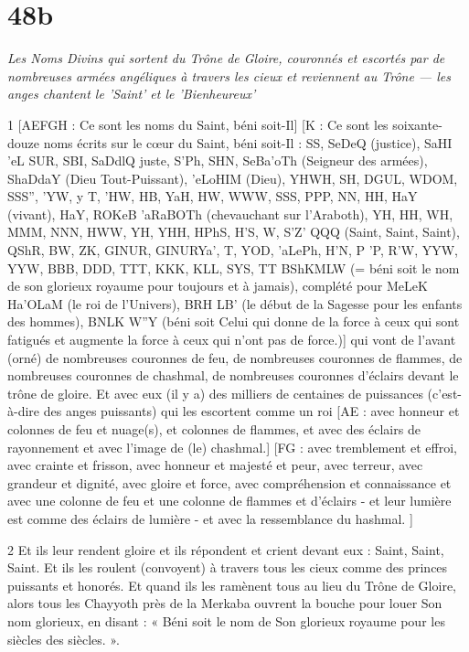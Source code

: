 \chapter{48b}

\par \textit{Les Noms Divins qui sortent du Trône de Gloire, couronnés et escortés par de nombreuses armées angéliques à travers les cieux et reviennent au Trône — les anges chantent le 'Saint' et le 'Bienheureux'}

\par 1 [AEFGH : Ce sont les noms du Saint, béni soit-Il] [K : Ce sont les soixante-douze noms écrits sur le cœur du Saint, béni soit-Il : SS, SeDeQ (justice), SaHI 'eL SUR, SBI, SaDdlQ {juste}, S'Ph, SHN, SeBa'oTh (Seigneur des armées), ShaDdaY (Dieu Tout-Puissant), 'eLoHIM (Dieu), YHWH, SH, DGUL, WDOM, SSS'', 'YW, y T, 'HW, HB, YaH, HW, WWW, SSS, PPP, NN, HH, HaY (vivant), HaY, ROKeB 'aRaBOTh (chevauchant sur l'Araboth), YH, HH, WH, MMM, NNN, HWW, YH, YHH, HPhS, H'S, W, S'Z' QQQ (Saint, Saint, Saint), QShR, BW, ZK, GINUR, GINURYa', T, YOD, 'aLePh, H'N, P 'P, R'W, YYW, YYW, BBB, DDD, TTT, KKK, KLL, SYS, TT BShKMLW (= béni soit le nom de son glorieux royaume pour toujours et à jamais), complété pour MeLeK Ha'OLaM (le roi de l'Univers), BRH LB' (le début de la Sagesse pour les enfants des hommes), BNLK W''Y (béni soit Celui qui donne de la force à ceux qui sont fatigués et augmente la force à ceux qui n'ont pas de force.)] qui vont de l'avant (orné) de nombreuses couronnes de feu, de nombreuses couronnes de flammes, de nombreuses couronnes de chashmal, de nombreuses couronnes d'éclairs devant le trône de gloire. Et avec eux (il y a) des milliers de centaines de puissances (c'est-à-dire des anges puissants) qui les escortent comme un roi [AE : avec honneur et colonnes de feu et nuage(s), et colonnes de flammes, et avec des éclairs de rayonnement et avec l'image de (le) chashmal.] [FG : avec tremblement et effroi, avec crainte et frisson, avec honneur et majesté et peur, avec terreur, avec grandeur et dignité, avec gloire et force, avec compréhension et connaissance et avec une colonne de feu et une colonne de flammes et d'éclairs - et leur lumière est comme des éclairs de lumière - et avec la ressemblance du hashmal. ]

\par 2 Et ils leur rendent gloire et ils répondent et crient devant eux : Saint, Saint, Saint. Et ils les roulent (convoyent) à travers tous les cieux comme des princes puissants et honorés. Et quand ils les ramènent tous au lieu du Trône de Gloire, alors tous les Chayyoth près de la Merkaba ouvrent la bouche pour louer Son nom glorieux, en disant : « Béni soit le nom de Son glorieux royaume pour les siècles des siècles. ».



